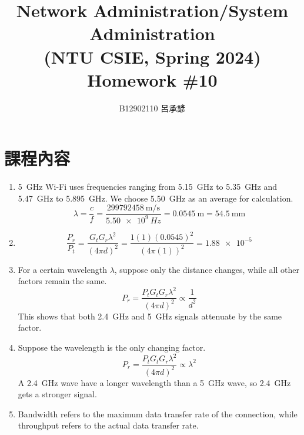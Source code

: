\documentclass[12pt, a4paper]{article}
\title{
  \vspace{-1cm}
  Network Administration/System Administration\\
  (NTU CSIE, Spring 2024)\\
  Homework \#10
}
\author{\Large B12902110 呂承諺}
\begin{document}
  \maketitle
  \section{課程內容}
  \begin{enumerate}[label=(\alph*)]
    \item 5~GHz Wi-Fi uses frequencies ranging from \qty{5.15}{\giga\hertz} to
    \qty{5.35}{\giga\hertz} and \qty{5.47}{\giga\hertz} to \qty{5.895}{\giga\hertz}.
    We choose \qty{5.50}{\giga\hertz} as an average for calculation.
    \[
      \lambda = \frac{c}{f}
      = \frac{\qty{299792458}{\meter/\second}}{\qty{5.50e9}{Hz}}
      = \qty{0.0545}{\meter} = \qty{54.5}{\milli\meter}
    \]

    \item
    \[
      \frac{P_r}{P_t} = \frac{G_tG_r\lambda^2}{\left(4\pi d\right)^2}
      = \frac{1 \left(1\right) \left(0.0545\right)^2}{\left(4\pi \left(1\right) \right)^2}
      = \num{1.88e-5}
    \]

    \item For a certain wavelength $\lambda$, suppose only the distance changes, while
    all other factors remain the same.
    \[
      P_r = \frac{P_t G_t G_r \lambda^2}{\left(4 \pi d\right)^2} \propto \frac{1}{d^2}
    \]
    This shows that both 2.4~GHz and 5~GHz signals attenuate by the same factor.

    \item Suppose the wavelength is the only changing factor.
    \[
      P_r = \frac{P_t G_t G_r \lambda^2}{\left(4 \pi d\right)^2} \propto \lambda^2
    \]
    A 2.4~GHz wave have a longer wavelength than a 5~GHz wave, so 2.4~GHz gets a stronger
    signal.

    \item Bandwidth refers to the maximum data transfer rate of the connection, while
    throughput refers to the actual data transfer rate.
  \end{enumerate}
\end{document}
